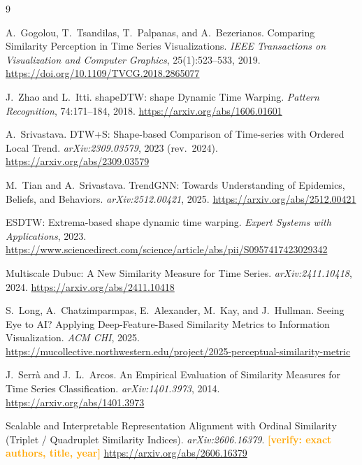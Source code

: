 \documentclass[11pt]{article}
\newcommand{\verify}[1]{\textcolor{orange}{\textbf{[verify: #1]}}}
\begin{document}
\begin{thebibliography}{9}

A.~Gogolou, T.~Tsandilas, T.~Palpanas, and A.~Bezerianos.
\newblock Comparing Similarity Perception in Time Series Visualizations.
\newblock \emph{IEEE Transactions on Visualization and Computer Graphics},
25(1):523--533, 2019.
\newblock \url{https://doi.org/10.1109/TVCG.2018.2865077}

J.~Zhao and L.~Itti.
\newblock shapeDTW: shape Dynamic Time Warping.
\newblock \emph{Pattern Recognition}, 74:171--184, 2018.
\newblock \url{https://arxiv.org/abs/1606.01601}

A.~Srivastava.
\newblock DTW+S: Shape-based Comparison of Time-series with Ordered Local Trend.
\newblock \emph{arXiv:2309.03579}, 2023 (rev.\ 2024).
\newblock \url{https://arxiv.org/abs/2309.03579}

M.~Tian and A.~Srivastava.
\newblock TrendGNN: Towards Understanding of Epidemics, Beliefs, and Behaviors.
\newblock \emph{arXiv:2512.00421}, 2025.
\newblock \url{https://arxiv.org/abs/2512.00421}

ESDTW: Extrema-based shape dynamic time warping.
\newblock \emph{Expert Systems with Applications}, 2023.
\newblock \url{https://www.sciencedirect.com/science/article/abs/pii/S0957417423029342}

Multiscale Dubuc: A New Similarity Measure for Time Series.
\newblock \emph{arXiv:2411.10418}, 2024.
\newblock \url{https://arxiv.org/abs/2411.10418}

S.~Long, A.~Chatzimparmpas, E.~Alexander, M.~Kay, and J.~Hullman.
\newblock Seeing Eye to AI? Applying Deep-Feature-Based Similarity Metrics to
Information Visualization.
\newblock \emph{ACM CHI}, 2025.
\newblock \url{https://mucollective.northwestern.edu/project/2025-perceptual-similarity-metric}

J.~Serr\`a and J.~L.~Arcos.
\newblock An Empirical Evaluation of Similarity Measures for Time Series Classification.
\newblock \emph{arXiv:1401.3973}, 2014.
\newblock \url{https://arxiv.org/abs/1401.3973}

Scalable and Interpretable Representation Alignment with Ordinal Similarity
(Triplet / Quadruplet Similarity Indices).
\newblock \emph{arXiv:2606.16379}. \verify{exact authors, title, year}
\newblock \url{https://arxiv.org/abs/2606.16379}

\end{thebibliography}
\end{document}
